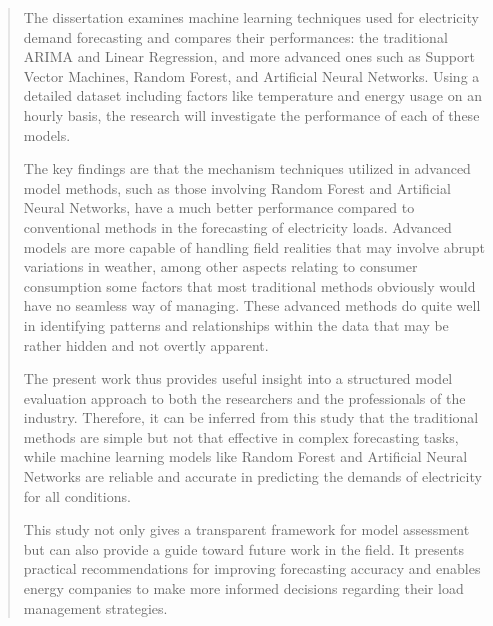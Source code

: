 \documentclass[12pt, a4paper,twoside]{report}
\theoremstyle{plain} %
\theoremstyle{definition} %
\theoremstyle{remark} %
\numberwithin{equation}{chapter}
\begin{document}
\begin{abstract}
The dissertation examines machine learning techniques used for electricity demand forecasting and compares their performances: the traditional ARIMA and Linear Regression, and more advanced ones such as Support Vector Machines, Random Forest, and Artificial Neural Networks. Using a detailed dataset including factors like temperature and energy usage on an hourly basis, the research will investigate the performance of each of these models.

The key findings are that the mechanism techniques utilized in advanced model methods, such as those involving Random Forest and Artificial Neural Networks, have a much better performance compared to conventional methods in the forecasting of electricity loads. Advanced models are more capable of handling field realities that may involve abrupt variations in weather, among other aspects relating to consumer consumption some factors that most traditional methods obviously would have no seamless way of managing. These advanced methods do quite well in identifying patterns and relationships within the data that may be rather hidden and not overtly apparent.

The present work thus provides useful insight into a structured model evaluation approach to both the researchers and the professionals of the industry. Therefore, it can be inferred from this study that the traditional methods are simple but not that effective in complex forecasting tasks, while machine learning models like Random Forest and Artificial Neural Networks are reliable and accurate in predicting the demands of electricity for all conditions.

This study not only gives a transparent framework for model assessment but can also provide a guide toward future work in the field. It presents practical recommendations for improving forecasting accuracy and enables energy companies to make more informed decisions regarding their load management strategies.

\end{abstract}

\tableofcontents
\newpage
\listoffigures
\newpage

\end{document}
